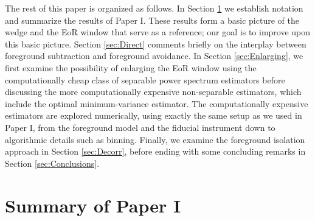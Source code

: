 \documentclass[twocolumn,aps,prd,nofootinbib,showpacs]{revtex4-1}
\begin{document}
The rest of this paper is organized as follows.  In Section \ref{sec:PaperI} we establish notation and summarize the results of Paper I.  These results form a basic picture of the wedge and the EoR window that serve as a reference; our goal is to improve upon this basic picture.  Section \ref{sec:Direct} comments briefly on the interplay between foreground subtraction and foreground avoidance.  In Section \ref{sec:Enlarging}, we first examine the possibility of enlarging the EoR window using the computationally cheap class of separable power spectrum estimators before discussing the more computationally expensive non-separable estimators, which include the optimal minimum-variance estimator.  The computationally expensive estimators are explored numerically, using exactly the same setup as we used in Paper I, from the foreground model and the fiducial instrument down to algorithmic details such as binning.  Finally, we examine the foreground isolation approach in Section \ref{sec:Decorr}, before ending with some concluding remarks in Section \ref{sec:Conclusions}.

\section{Summary of Paper I}
\label{sec:PaperI}
\end{document}
